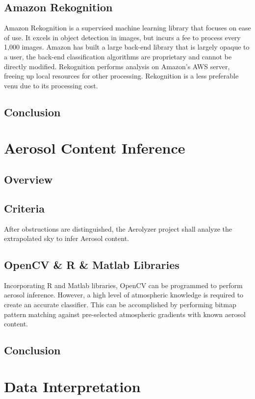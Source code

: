 \documentclass[journal,10pt,draftclsnofoot,onecolumn]{IEEEtran}
\begin{document}
\begin{singlespace}
	\subsection{Amazon Rekognition}
	Amazon Rekognition is a supervised machine learning library that focuses on ease of use.
	It excels in object detection in images, but incurs a fee to process every 1,000 images.
	Amazon has built a large back-end library that is largely opaque to a user, the back-end classification algorithms are proprietary and cannot be directly modified.
	Rekognition performs analysis on Amazon’s AWS server, freeing up local resources for other processing.
	Rekognition is a less preferable venu due to its processing cost.

	\subsection{Conclusion}

\section{Aerosol Content Inference}
	\subsection{Overview}

	\subsection{Criteria}
	After obstructions are distinguished, the Aerolyzer project shall analyze the extrapolated sky to infer Aerosol content.

	\subsection{OpenCV \& R \& Matlab Libraries}
	Incorporating R and Matlab libraries, OpenCV can be programmed to perform aerosol inference.
	However, a high level of atmospheric knowledge is required to create an accurate classifier.
	This can be accomplished by performing bitmap pattern matching against pre-selected atmospheric gradients with known aerosol content.

	\subsection{Conclusion}

\section{Data Interpretation}

\end{singlespace}
\end{document}
